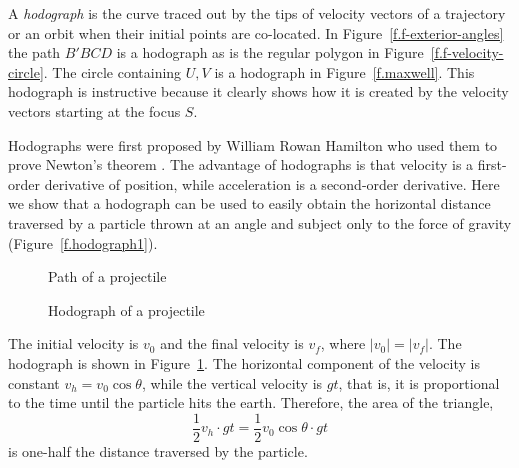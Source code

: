 A \emph{hodograph} is the curve traced out by the tips of velocity vectors of a trajectory or an orbit when their initial points are co-located. In Figure~\ref{f.f-exterior-angles} the path $B'BCD$ is a hodograph as is the regular polygon in Figure~\ref{f.f-velocity-circle}. The circle containing $U,V$ is a hodograph in Figure~\ref{f.maxwell}. This hodograph is instructive because it clearly shows how it is created by the velocity vectors starting at the focus $S$.

Hodographs were first proposed by William Rowan Hamilton who used them to prove Newton's theorem \cite{hamilton}. The advantage of hodographs is that velocity is a first-order derivative of position, while acceleration is a second-order derivative. Here we show that a hodograph can be used to easily obtain the horizontal distance traversed by a particle thrown at an angle and subject only to the force of gravity (Figure~\ref{f.hodograph1}).


\begin{figure}[t]
\begin{center}
\begin{minipage}{.45\textwidth}
\begin{center}
\caption{Path of a projectile}\label{f.hodograph1}
\end{center}
\end{minipage}
\hspace{3em}
\begin{minipage}{.45\textwidth}
\begin{center}
\caption{Hodograph of a projectile}\label{f.hodograph2}
\end{center}
\end{minipage}
\end{center}
\end{figure}

The initial velocity is $v_0$ and the final velocity is $v_f$, where $|v_0|=|v_f|$. The hodograph is shown in Figure~\ref{f.hodograph2}. The horizontal component of the velocity is constant $v_h=v_0\cos \theta$, while the vertical velocity is $gt$, that is, it is proportional to the time until the particle hits the earth. Therefore, the area of the triangle,
\[
\frac{1}{2}v_h\cdot gt = \frac{1}{2}v_0\cos\theta \cdot gt
\]
is one-half the distance traversed by the particle.
